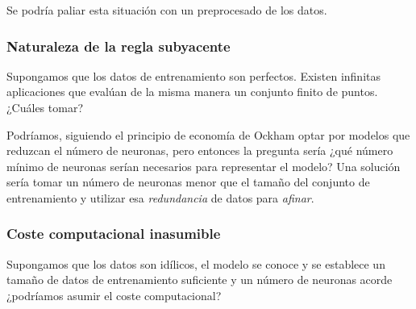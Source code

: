 Se podría paliar esta situación con un
 preprocesado de los datos. 

\subsubsection*{ Naturaleza de la regla subyacente}  

Supongamos que los datos de entrenamiento son perfectos. Existen infinitas aplicaciones 
que evalúan de la misma manera un conjunto finito de puntos. 
¿Cuáles tomar?

Podríamos, siguiendo el principio de economía de Ockham optar
por modelos que reduzcan el número de neuronas, pero entonces la 
pregunta sería  ¿qué número mínimo de neuronas serían necesarios para representar el modelo? 
Una solución sería tomar un número de neuronas menor que el tamaño del conjunto de 
entrenamiento y utilizar esa \textit{redundancia} de datos para 
\textit{afinar}. 

\subsubsection*{Coste computacional inasumible}  
Supongamos que los datos son idílicos, el modelo se conoce y se establece un tamaño de datos de entrenamiento suficiente y
un número de neuronas acorde  ¿podríamos asumir el coste computacional?

